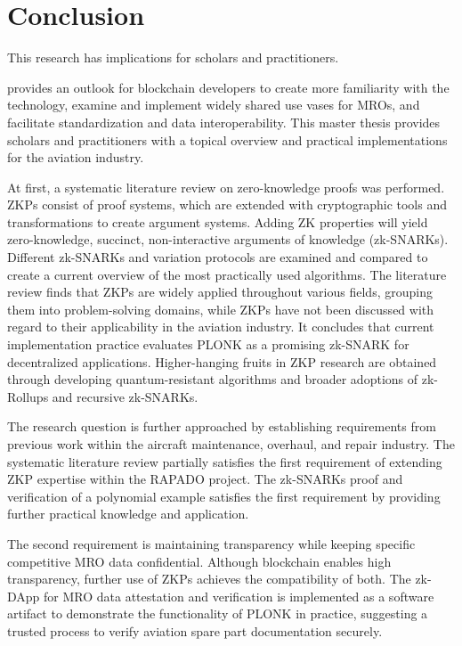 \chapter{Conclusion}
This research has implications for scholars and practitioners. 

\citet{efthymiou} provides an outlook for blockchain developers to create more familiarity with the technology, examine and implement widely shared use vases for MROs, and facilitate standardization and data interoperability. This master thesis provides scholars and practitioners with a topical overview and practical implementations for the aviation industry.

At first, a systematic literature review on zero-knowledge proofs was performed. ZKPs consist of proof systems, which are extended with cryptographic tools and transformations to create argument systems. Adding ZK properties will yield zero-knowledge, succinct, non-interactive arguments of knowledge (zk-SNARKs). Different zk-SNARKs and variation protocols are examined and compared to create a current overview of the most practically used algorithms. The literature review finds that ZKPs are widely applied throughout various fields, grouping them into problem-solving domains, while ZKPs have not been discussed with regard to their applicability in the aviation industry. It concludes that current implementation practice evaluates PLONK as a promising zk-SNARK for decentralized applications. Higher-hanging fruits in ZKP research are obtained through developing quantum-resistant algorithms and broader adoptions of zk-Rollups and recursive zk-SNARKs.

The research question is further approached by establishing requirements from previous work within the aircraft maintenance, overhaul, and repair industry. The systematic literature review partially satisfies the first requirement of extending ZKP expertise within the RAPADO project. The zk-SNARKs proof and verification of a polynomial example satisfies the first requirement by providing further practical knowledge and application. 

The second requirement is maintaining transparency while keeping specific competitive MRO data confidential. Although blockchain enables high transparency, further use of ZKPs achieves the compatibility of both. The zk-DApp for MRO data attestation and verification is implemented as a software artifact to demonstrate the functionality of PLONK in practice, suggesting a trusted process to verify aviation spare part documentation securely. 

